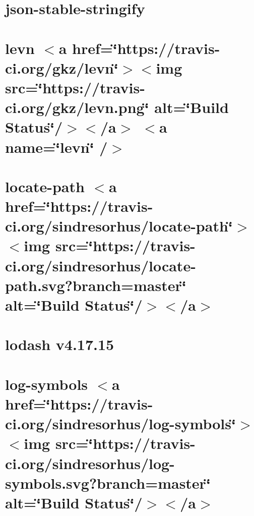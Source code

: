 \let\mypdfximage\pdfximage\def\pdfximage{\immediate\mypdfximage}\documentclass[twoside]{book}
\newcommand{\+}{\discretionary{\mbox{\scriptsize$\hookleftarrow$}}{}{}}
\begin{document}
\chapter{json-\/stable-\/stringify}
\label{md_heap-visualizer_node_modules_json-stable-stringify-without-jsonify_readme}

\chapter{levn $<$a href=\char`\"{}https\+://travis-\/ci.\+org/gkz/levn\char`\"{}$>$$<$img src=\char`\"{}https\+://travis-\/ci.\+org/gkz/levn.\+png\char`\"{} alt=\char`\"{}\+Build Status\char`\"{}/$>$$<$/a$>$ $<$a name=\char`\"{}levn\char`\"{} /$>$}
\label{md_heap-visualizer_node_modules_levn__r_e_a_d_m_e}

\chapter{locate-\/path $<$a href=\char`\"{}https\+://travis-\/ci.\+org/sindresorhus/locate-\/path\char`\"{}$>$$<$img src=\char`\"{}https\+://travis-\/ci.\+org/sindresorhus/locate-\/path.\+svg?branch=master\char`\"{} alt=\char`\"{}\+Build Status\char`\"{}/$>$$<$/a$>$}
\label{md_heap-visualizer_node_modules_locate-path_readme}

\chapter{lodash v4.17.15}
\label{md_heap-visualizer_node_modules_lodash__r_e_a_d_m_e}

\chapter{log-\/symbols $<$a href=\char`\"{}https\+://travis-\/ci.\+org/sindresorhus/log-\/symbols\char`\"{}$>$$<$img src=\char`\"{}https\+://travis-\/ci.\+org/sindresorhus/log-\/symbols.\+svg?branch=master\char`\"{} alt=\char`\"{}\+Build Status\char`\"{}/$>$$<$/a$>$}
\label{md_heap-visualizer_node_modules_log-symbols_readme}

\end{document}
